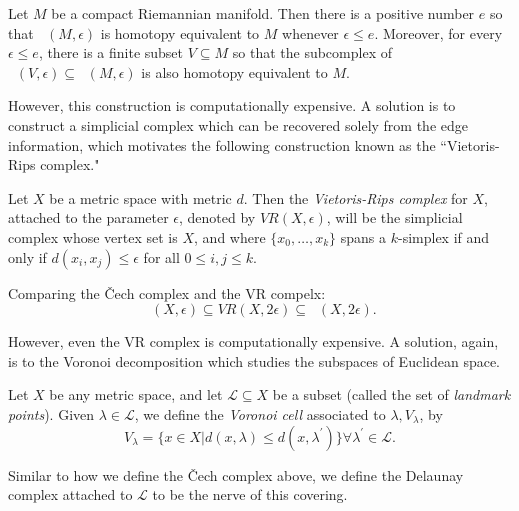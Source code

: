 \documentclass[11pt,reqno,oneside,a4paper]{article}
\DeclareMathOperator{\Cech}{\check{C}}
\begin{document}
\begin{thm}
Let $M$ be a compact Riemannian manifold. Then there is a positive number $e$ so that $\Cech(M, \epsilon)$ is homotopy equivalent to $M$ whenever $\epsilon \leq e$. Moreover, for every $ \epsilon \leq e$, there is a finite subset $V \subseteq M$ so that the subcomplex of $\Cech(V,\epsilon) \subseteq \Cech(M, \epsilon)$ is also homotopy equivalent to $M$.
\end{thm}

However, this construction is computationally expensive. A solution is to construct a simplicial complex which can be recovered solely from the edge information, which motivates the following construction known as the ``Vietoris-Rips complex." 

\begin{defn}
	Let $X$ be a metric space with metric $d$. Then the  \textit{Vietoris-Rips complex} for $X$, attached to the parameter $\epsilon$, denoted by $VR(X,\epsilon)$, will be the simplicial complex whose vertex set is $X$, and where $\{x_0,\dots, x_k\}$ spans a $k$-simplex if and only if $d(x_i,x_j) \leq \epsilon$ for all $0\leq i,j\leq k.$
\end{defn}

\begin{prop}
	Comparing the \v{C}ech complex and the VR compelx:
	$$ \Cech(X,\epsilon) \subseteq VR (X,2\epsilon) \subseteq \Cech(X,2\epsilon).$$
\end{prop}

However, even the VR complex is computationally expensive. A solution, again, is to the Voronoi decomposition which studies the subspaces of Euclidean space. 

\begin{thm}
	Let $X$ be any metric space, and let $\mathcal{L}\subseteq X$ be a subset (called the set of \textit{landmark points}). Given $\lambda \in \mathcal{L}$, we define the \textit{Voronoi cell} associated to $\lambda, V_\lambda$, by
	$$V_\lambda = \{x\in X| d(x,\lambda) \leq d(x,\lambda^\prime)\} \forall \lambda^\prime \in \mathcal{L}.$$
\end{thm}


\begin{defn}
	Similar to how we define the \v{C}ech complex above, we define the Delaunay complex attached to $\mathcal{L}$ to be the nerve of this covering.
\end{defn}
\end{document}
